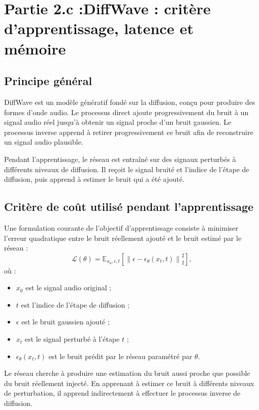 \section{Partie 2.c :DiffWave : critère d'apprentissage, latence et mémoire}

\subsection{Principe général}

DiffWave est un modèle génératif fondé sur la diffusion, conçu pour produire des formes d'onde audio. Le processus direct ajoute progressivement du bruit à un signal audio réel jusqu'à obtenir un signal proche d'un bruit gaussien. Le processus inverse apprend à retirer progressivement ce bruit afin de reconstruire un signal audio plausible.

Pendant l'apprentissage, le réseau est entraîné sur des signaux perturbés à différents niveaux de diffusion. Il reçoit le signal bruité et l'indice de l'étape de diffusion, puis apprend à estimer le bruit qui a été ajouté.

\subsection{Critère de coût utilisé pendant l'apprentissage}

Une formulation courante de l'objectif d'apprentissage consiste à minimiser l'erreur quadratique entre le bruit réellement ajouté et le bruit estimé par le réseau :
\begin{equation}
\mathcal{L}(\theta)=
\mathbb{E}_{x_0,\epsilon,t}
\left[
\left\|
\epsilon-\epsilon_\theta(x_t,t)
\right\|_2^2
\right],
\end{equation}
où :
\begin{itemize}
    \item $x_0$ est le signal audio original ;
    \item $t$ est l'indice de l'étape de diffusion ;
    \item $\epsilon$ est le bruit gaussien ajouté ;
    \item $x_t$ est le signal perturbé à l'étape $t$ ;
    \item $\epsilon_\theta(x_t,t)$ est le bruit prédit par le réseau paramétré par $\theta$.
\end{itemize}

Le réseau cherche à produire une estimation du bruit aussi proche que possible du bruit réellement injecté. En apprenant à estimer ce bruit à différents niveaux de perturbation, il apprend indirectement à effectuer le processus inverse de diffusion.

